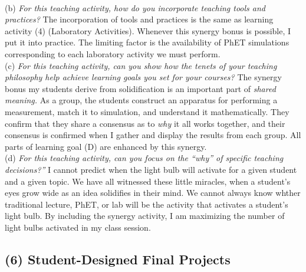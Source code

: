 \documentclass[../../../main.tex]{subfiles}
\begin{document}
\\
\vspace{0.25cm}
(b) \textit{For this teaching activity, how do you incorporate teaching tools and practices?}  The incorporation of tools and practices is the same as learning activity (4) (Laboratory Activities).  Whenever this synergy bonus is possible, I put it into practice.  The limiting factor is the availability of PhET simulations corresponding to each laboratory activity we must perform.
\\
\vspace{0.25cm}
(c) \textit{For this teaching activity, can you show how the tenets of your teaching philosophy help achieve learning goals you
set for your courses?}  The synergy bonus my students derive from solidification is an important part of \textit{shared meaning.}  As a group, the students construct an apparatus for performing a measurement, match it to simulation, and understand it mathematically.  They confirm that they share a consensus as to \textit{why} it all works together, and their consensus is confirmed when I gather and display the results from each group.  All parts of learning goal (D) are enhanced by this synergy.
\\
\vspace{0.25cm}
(d) \textit{For this teaching activity, can you focus on the ``why'' of specific teaching decisions?''} I cannot predict when the light bulb will activate for a given student and a given topic.  We have all witnessed these little miracles, when a student's eyes grow wide as an idea solidifies in their mind.  We cannot always know whther traditional lecture, PhET, or lab will be the activity that activates a student's light bulb.  By including the synergy activity, I am maximizing the number of light bulbs activated in my class session.

\subsection{(6) Student-Designed Final Projects}
\end{document}
